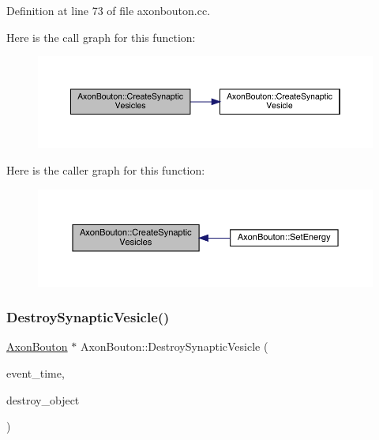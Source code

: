 Definition at line 73 of file axonbouton.\+cc.

Here is the call graph for this function\+:\nopagebreak
\begin{figure}[H]
\begin{center}
\leavevmode
\includegraphics[width=350pt]{class_axon_bouton_a0cabe429536722f14ae800c8579168b7_cgraph}
\end{center}
\end{figure}
Here is the caller graph for this function\+:\nopagebreak
\begin{figure}[H]
\begin{center}
\leavevmode
\includegraphics[width=350pt]{class_axon_bouton_a0cabe429536722f14ae800c8579168b7_icgraph}
\end{center}
\end{figure}
\mbox{\label{class_axon_bouton_a75592b4ccc589db756183f4aaa694ffe}} 
\subsubsection{\texorpdfstring{Destroy\+Synaptic\+Vesicle()}{DestroySynapticVesicle()}}
{\footnotesize\ttfamily \hyperlink{class_axon_bouton}{Axon\+Bouton} $\ast$ Axon\+Bouton\+::\+Destroy\+Synaptic\+Vesicle (\begin{DoxyParamCaption}\item[{std\+::chrono\+::time\+\_\+point$<$ \hyperlink{universe_8h_a0ef8d951d1ca5ab3cfaf7ab4c7a6fd80}{Clock} $>$}]{event\+\_\+time,  }\item[{\hyperlink{class_axon_bouton}{Axon\+Bouton} $\ast$}]{destroy\+\_\+object }\end{DoxyParamCaption})}




